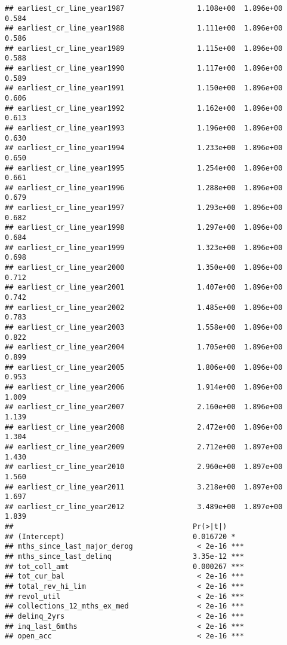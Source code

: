 \documentclass[]{article}
\begin{document}
\begin{verbatim}
## earliest_cr_line_year1987                 1.108e+00  1.896e+00    0.584
## earliest_cr_line_year1988                 1.111e+00  1.896e+00    0.586
## earliest_cr_line_year1989                 1.115e+00  1.896e+00    0.588
## earliest_cr_line_year1990                 1.117e+00  1.896e+00    0.589
## earliest_cr_line_year1991                 1.150e+00  1.896e+00    0.606
## earliest_cr_line_year1992                 1.162e+00  1.896e+00    0.613
## earliest_cr_line_year1993                 1.196e+00  1.896e+00    0.630
## earliest_cr_line_year1994                 1.233e+00  1.896e+00    0.650
## earliest_cr_line_year1995                 1.254e+00  1.896e+00    0.661
## earliest_cr_line_year1996                 1.288e+00  1.896e+00    0.679
## earliest_cr_line_year1997                 1.293e+00  1.896e+00    0.682
## earliest_cr_line_year1998                 1.297e+00  1.896e+00    0.684
## earliest_cr_line_year1999                 1.323e+00  1.896e+00    0.698
## earliest_cr_line_year2000                 1.350e+00  1.896e+00    0.712
## earliest_cr_line_year2001                 1.407e+00  1.896e+00    0.742
## earliest_cr_line_year2002                 1.485e+00  1.896e+00    0.783
## earliest_cr_line_year2003                 1.558e+00  1.896e+00    0.822
## earliest_cr_line_year2004                 1.705e+00  1.896e+00    0.899
## earliest_cr_line_year2005                 1.806e+00  1.896e+00    0.953
## earliest_cr_line_year2006                 1.914e+00  1.896e+00    1.009
## earliest_cr_line_year2007                 2.160e+00  1.896e+00    1.139
## earliest_cr_line_year2008                 2.472e+00  1.896e+00    1.304
## earliest_cr_line_year2009                 2.712e+00  1.897e+00    1.430
## earliest_cr_line_year2010                 2.960e+00  1.897e+00    1.560
## earliest_cr_line_year2011                 3.218e+00  1.897e+00    1.697
## earliest_cr_line_year2012                 3.489e+00  1.897e+00    1.839
##                                          Pr(>|t|)    
## (Intercept)                              0.016720 *  
## mths_since_last_major_derog               < 2e-16 ***
## mths_since_last_delinq                   3.35e-12 ***
## tot_coll_amt                             0.000267 ***
## tot_cur_bal                               < 2e-16 ***
## total_rev_hi_lim                          < 2e-16 ***
## revol_util                                < 2e-16 ***
## collections_12_mths_ex_med                < 2e-16 ***
## delinq_2yrs                               < 2e-16 ***
## inq_last_6mths                            < 2e-16 ***
## open_acc                                  < 2e-16 ***

\end{verbatim}
\end{document}
